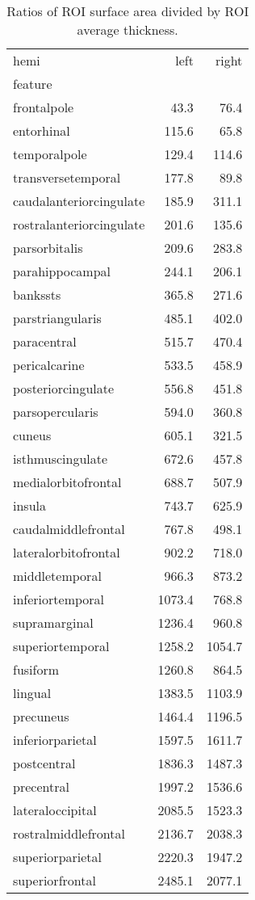 \documentclass{article}
\begin{document}
\begin{table}
\centering
\begin{tabular}{lrr}
\toprule
hemi & left & right \\
feature &  &  \\
\midrule
frontalpole & 43.3 & 76.4 \\
entorhinal & 115.6 & 65.8 \\
temporalpole & 129.4 & 114.6 \\
transversetemporal & 177.8 & 89.8 \\
caudalanteriorcingulate & 185.9 & 311.1 \\
rostralanteriorcingulate & 201.6 & 135.6 \\
parsorbitalis & 209.6 & 283.8 \\
parahippocampal & 244.1 & 206.1 \\
bankssts & 365.8 & 271.6 \\
parstriangularis & 485.1 & 402.0 \\
paracentral & 515.7 & 470.4 \\
pericalcarine & 533.5 & 458.9 \\
posteriorcingulate & 556.8 & 451.8 \\
parsopercularis & 594.0 & 360.8 \\
cuneus & 605.1 & 321.5 \\
isthmuscingulate & 672.6 & 457.8 \\
medialorbitofrontal & 688.7 & 507.9 \\
insula & 743.7 & 625.9 \\
caudalmiddlefrontal & 767.8 & 498.1 \\
lateralorbitofrontal & 902.2 & 718.0 \\
middletemporal & 966.3 & 873.2 \\
inferiortemporal & 1073.4 & 768.8 \\
supramarginal & 1236.4 & 960.8 \\
superiortemporal & 1258.2 & 1054.7 \\
fusiform & 1260.8 & 864.5 \\
lingual & 1383.5 & 1103.9 \\
precuneus & 1464.4 & 1196.5 \\
inferiorparietal & 1597.5 & 1611.7 \\
postcentral & 1836.3 & 1487.3 \\
precentral & 1997.2 & 1536.6 \\
lateraloccipital & 2085.5 & 1523.3 \\
rostralmiddlefrontal & 2136.7 & 2038.3 \\
superiorparietal & 2220.3 & 1947.2 \\
superiorfrontal & 2485.1 & 2077.1 \\
\bottomrule
\end{tabular}
\footnotesize
\caption{Ratios of ROI surface area divided by ROI average thickness.}
\normalsize
\label{tab:sa-ratios}
\end{table}
\end{document}
